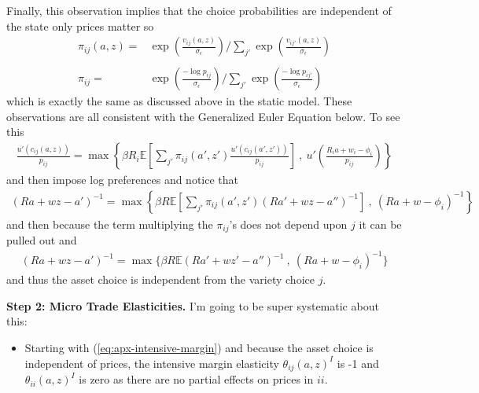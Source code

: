 \documentclass[12pt,pdftex]{article}
\begin{document}
\begin{onehalfspacing}
Finally, this observation implies that the choice probabilities are independent of the state only prices matter so
\begin{align}
\pi_{ij}(a, z) = & \exp \left( \frac{ v_{ij}(a, z) }{\sigma_{\epsilon}} \right) \Bigg / \sum_{j'} \exp \left( \frac{ v_{ij'}(a, z ) }{\sigma_{\epsilon}} \right) \\
\nonumber\\
\pi_{ij} = & \exp \left( \frac{  -\log p_{ij} }{\sigma_{\epsilon}} \right) \Bigg / \sum_{j'} \exp \left( \frac{ -\log p_{ij'} }{\sigma_{\epsilon}} \right)
\end{align}
which is exactly the same as discussed above in the static model. These observations are all consistent with the Generalized Euler Equation below. To see this
\begin{align}
\frac{u'(c_{ij}(a, z))}{p_{ij}} = \max \left\{ \beta R_{i} \mathbb{E} \left[ \sum_{j'} \pi_{ij}(a', z') \frac{u'(c_{ij}(a', z'))}{p_{ij}} \right] \ , \  u' \left( \frac{R_i a + w_i - \phi_{i}}{p_{ij}} \right) \right \}
\end{align}
and then impose log preferences and notice that
\begin{align}
(Ra + wz - a')^{-1} = \max \left\{ \beta R \mathbb{E} \left[ \sum_{j'} \pi_{ij}(a', z') (Ra' + wz - a'')^{-1} \right] \ , \   (R a + w - \phi_{i})^{-1} \right \}
\end{align}
and then because the term multiplying the $\pi_{ij}$'s does not depend upon $j$ it can be pulled out and
\begin{align}
(Ra + wz - a')^{-1} = \max \bigg \{ \beta R \mathbb{E} (Ra' + wz' - a'')^{-1}  \ , \   (R a + w - \phi_{i})^{-1}  \bigg \}
\end{align}
and thus the asset choice is independent from the variety choice $j$.

\textbf{Step 2: Micro Trade Elasticities.} I'm going to be super systematic about this:
\begin{itemize}
\item Starting with (\ref{eq:apx-intensive-margin}) and because the asset choice is independent of prices, the intensive margin elasticity $\theta_{ij}(a,z)^I$ is -1 and $\theta_{ii}(a,z)^I$ is zero as there are no partial effects on prices in $ii$.


\end{itemize}
\end{onehalfspacing}
\end{document}

